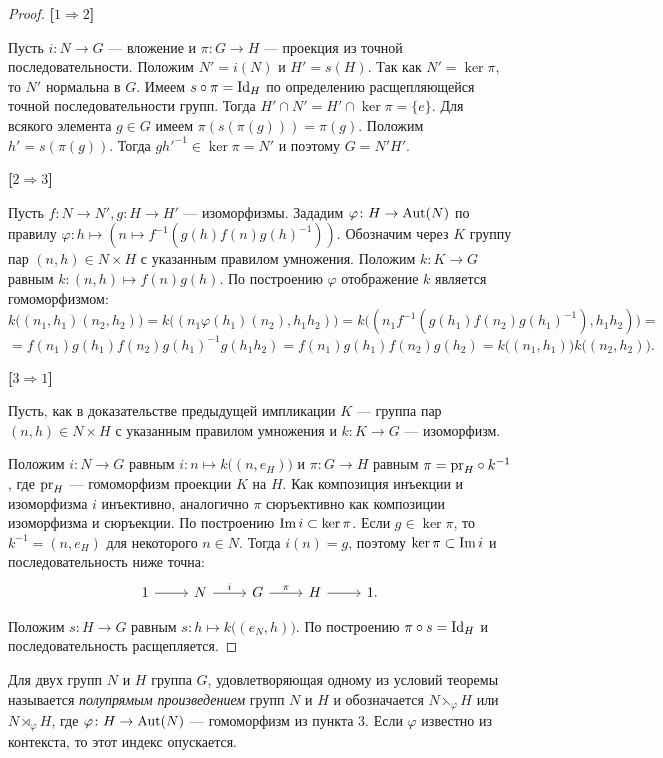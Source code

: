 \begin{proof}
	\hfill
	
	\textbf{[$ 1 \Rightarrow 2 $]}
	
	Пусть $ i \colon N \to G $ --- вложение и $ \pi \colon G \to H $ --- проекция из точной последовательности.
	Положим $ N' = i(N) $ и $ H' = s(H) $. Так как $ N' = \ker \pi $, то $ N' $ нормальна в $ G $.
	Имеем $ s \circ \pi = \mathrm{Id}_H $ по определению расщепляющейся точной последовательности групп.
	Тогда $ H' \cap N' =  H' \cap \ker \pi = \{e\} $.
	Для всякого элемента $ g \in G $ имеем $ \pi(s(\pi(g))) = \pi(g) $.
	Положим $ h' = s(\pi(g)) $.
	Тогда $ gh'^{-1} \in \ker \pi = N' $ и поэтому $ G = N'H' $.
	
	\textbf{[$ 2 \Rightarrow 3 $]}
	
	Пусть $ f \colon N \to N',  g \colon H \to H' $ --- изоморфизмы.
	Зададим $ \varphi \colon H \to \mathrm{Aut}(N) $ по правилу $ \varphi \colon h \mapsto (n \mapsto f^{-1}(g(h)f(n)g(h)^{-1})) $.
	Обозначим через $ K $ группу пар $ (n, h) \in N \times H $ с указанным правилом умножения.
	Положим $ k \colon K \to G $ равным $ k \colon (n, h) \mapsto f(n)g(h) $.
	По построению $ \varphi $ отображение $ k $ является гомоморфизмом:
	$$ k\big((n_1,h_1)(n_2, h_2)\big) = k \big((n_1\varphi(h_1)(n_2), h_1h_2)\big)
	= k \big((n_1f^{-1}(g(h_1)f(n_2)g(h_1)^{-1}) , h_1h_2) \big) = $$
	$$ = f(n_1)g(h_1)f(n_2)g(h_1)^{-1}g(h_1h_2) = f(n_1)g(h_1)f(n_2)g(h_2)
	= k\big((n_1, h_1) \big) k\big((n_2, h_2) \big). $$
	
	\textbf{[$ 3 \Rightarrow 1 $]}
	
	Пусть, как в доказательстве предыдущей импликации $ K $ --- группа пар $ (n, h) \in N \times H $ с указанным правилом умножения и $ k \colon K \to G $ --- изоморфизм.
	
	Положим $ i \colon N \to G $ равным $ i \colon n \mapsto k\big((n, e_H) \big) $
	и $ \pi \colon G \to H $ равным $ \pi = \mathrm{pr}_{H} \circ k^{-1} $,
	где $ \mathrm{pr}_{H} $ --- гомоморфизм проекции $ K $ на $ H $.
	Как композиция инъекции и изоморфизма $ i $ инъективно,
	аналогично $ \pi $ сюръективно как композиции изоморфизма и сюръекции.
	По построению $ \mathrm{Im} \, i \subset \ker \pi $.
	Если $ g \in \ker \pi $, то $ k^{-1} = (n, e_H) $ для некоторого $ n \in N $.
	Тогда $ i(n) = g $, поэтому $ \ker \pi \subset \mathrm{Im} \, i $ и последовательность ниже точна:
	$$ \begin{tikzcd}
	1 \ar{r}{} & N \ar{r}[above]{i} & G \ar{r}[above]{\pi} & H \ar{r} & 1.
	\end{tikzcd} $$
	
	Положим $ s \colon H \to G $ равным $ s \colon h \mapsto k\big((e_N, h) \big) $.
	По построению $ \pi \circ s = \mathrm{Id}_H $ и последовательность расщепляется.
	
\end{proof}

Для двух групп $ N $ и $ H $ группа $ G $, удовлетворяющая одному из условий теоремы называется \textit{полупрямым произведением} групп $ N $ и $ H $ и обозначается $ N \leftthreetimes_{\varphi} H $ или $ N \rtimes_{\varphi} H $,
где $ \varphi \colon H \to \mathrm{Aut}(N) $ --- гомоморфизм из пункта 3. Если $ \varphi $ известно из контекста, то этот индекс опускается.